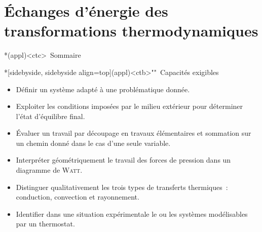 \documentclass[../../main/main.tex]{subfiles}
\begin{document}
\setcounter{chapter}{1}


\chapter{Échanges d'énergie des transformations thermodynamiques}

\vspace*{\fill}

\begin{tcn}*(appl)<ctc>{\iconsomm~Sommaire}
	\vspace{-15pt}
	\minitoc
	\vspace{-25pt}
\end{tcn}

\begin{tcn}*[sidebyside, sidebyside align=top](appl)<ctb>""{\iconhow~Capacités exigibles}
	\begin{itemize}[label=\rcheck]
		\item Définir un système adapté à une problématique donnée.

		\item Exploiter les conditions imposées par le milieu extérieur pour
		      déterminer l'état d'équilibre final.

		\item Évaluer un travail par découpage en travaux élémentaires et sommation
		      sur un chemin donné dans le cas d'une seule variable.
	\end{itemize}
	\tcblower
	\begin{itemize}[label=\rcheck]
		\item Interpréter géométriquement le travail des forces de pression dans un
		      diagramme de \textsc{Watt}.

		\item Distinguer qualitativement les trois types de transferts thermiques~:
		      conduction, convection et rayonnement.

		\item Identifier dans une situation expérimentale le ou les systèmes
		      modélisables par un thermostat.
	\end{itemize}
\end{tcn}

\vspace*{\fill}

\newpage
\end{document}
